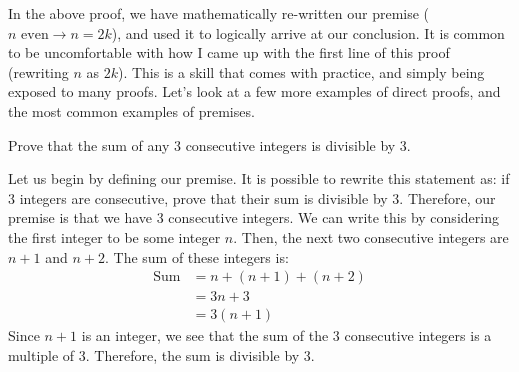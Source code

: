 In the above proof, we have mathematically re-written our premise ($n \text{ even} \rightarrow n = 2k$),
and used it to logically arrive at our conclusion. It is common to be uncomfortable with how I came up with 
the first line of this proof (rewriting $n$ as $2k$). This is a skill that comes with practice, and simply being
exposed to many proofs. Let's look at a few more examples of direct proofs, and the most common examples of premises.

\begin{exercise}[Easy]
  Prove that the sum of any 3 consecutive integers is divisible by 3.
\end{exercise}
\begin{answer}
  Let us begin by defining our premise. It is possible to rewrite this statement as: if 3 integers are consecutive, 
  prove that their sum is divisible by 3. Therefore, our premise is that we have 3 consecutive integers.
  We can write this by considering the first integer to be some integer $n$. Then, the next two consecutive integers are $n+1$ 
  and $n+2$. The sum of these integers is:
  \begin{align*}
    \text{Sum} &= n + (n+1) + (n+2) \\
               &= 3n + 3 \\
               &= 3(n + 1)
  \end{align*}
  Since $n + 1$ is an integer, we see that the sum of the 3 consecutive integers is a multiple of 3.
  Therefore, the sum is divisible by 3.
\end{answer}

